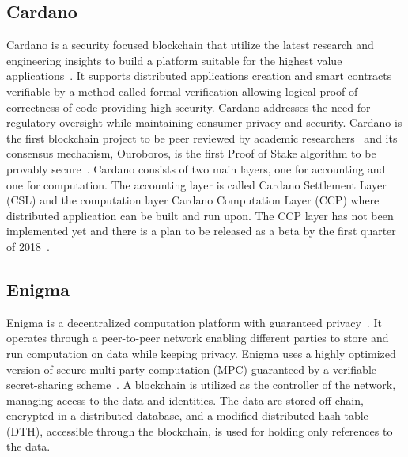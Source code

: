 \subsection{Cardano}\label{blockchain:impl:cardano}

Cardano is a security focused blockchain that utilize the latest research and engineering insights to build a platform suitable for
the highest value applications~\cite{cardano_site}. It supports distributed applications creation and smart contracts verifiable by a method called formal
verification allowing logical proof of correctness of code providing high security. Cardano addresses the need for regulatory oversight while
maintaining consumer privacy and security. Cardano is the first blockchain project to be peer reviewed by academic researchers~\cite{cardano_site} and its consensus
mechanism, Ouroboros, is the first Proof of Stake algorithm to be provably secure~\cite{Kiayias2017}.
Cardano consists of two main layers, one for accounting and one for computation. The accounting layer is called Cardano Settlement Layer (CSL)
and the computation layer Cardano Computation Layer (CCP) where distributed application can be built and run upon. The CCP layer has not been
implemented yet and there is a plan to be released as a beta by the first quarter of 2018~\cite{cardano_parsons}.

\subsection{Enigma}\label{blockchain:impl:enigma}

Enigma is a decentralized computation platform with guaranteed privacy~\cite{DBLP:journals/corr/ZyskindNP15}. It operates through a peer-to-peer network enabling
different parties to store and run computation on data while keeping privacy. Enigma uses a highly optimized version of secure multi-party computation (MPC)
guaranteed by a verifiable secret-sharing scheme~\cite{DBLP:journals/corr/ZyskindNP15}. A blockchain is utilized as the controller of the network, managing access to the data and identities.
The data are stored off-chain, encrypted in a distributed database, and a modified distributed hash table (DTH), accessible through the blockchain, is used for holding only references to the data.
